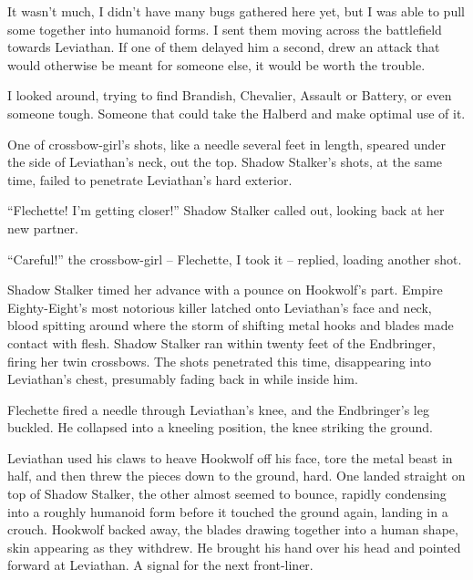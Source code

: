 It wasn't much, I didn't have many bugs gathered here yet, but I was able to pull some together into humanoid forms.  I sent them moving across the battlefield towards Leviathan.  If one of them delayed him a second, drew an attack that would otherwise be meant for someone else, it would be worth the trouble.



I looked around, trying to find Brandish, Chevalier, Assault or Battery, or even someone tough.  Someone that could take the Halberd and make optimal use of it.



One of crossbow-girl's shots, like a needle several feet in length, speared under the side of Leviathan's neck, out the top.  Shadow Stalker's shots, at the same time, failed to penetrate Leviathan's hard exterior.



``Flechette!  I'm getting closer!'' Shadow Stalker called out, looking back at her new partner.



``Careful!'' the crossbow-girl – Flechette, I took it – replied, loading another shot.



Shadow Stalker timed her advance with a pounce on Hookwolf's part.  Empire Eighty-Eight's most notorious killer latched onto Leviathan's face and neck, blood spitting around where the storm of shifting metal hooks and blades made contact with flesh.  Shadow Stalker ran within twenty feet of the Endbringer, firing her twin crossbows.  The shots penetrated this time, disappearing into Leviathan's chest, presumably fading back in while inside him.



Flechette fired a needle through Leviathan's knee, and the Endbringer's leg buckled.  He collapsed into a kneeling position, the knee striking the ground.



Leviathan used his claws to heave Hookwolf off his face, tore the metal beast in half, and then threw the pieces down to the ground, hard.  One landed straight on top of Shadow Stalker, the other almost seemed to bounce, rapidly condensing into a roughly humanoid form before it touched the ground again, landing in a crouch.  Hookwolf backed away, the blades drawing together into a human shape, skin appearing as they withdrew.  He brought his hand over his head and pointed forward at Leviathan.  A signal for the next front-liner.



